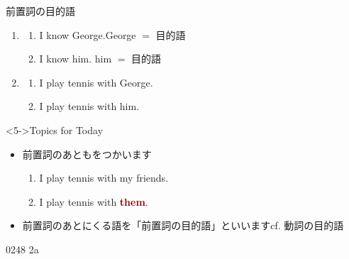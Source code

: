 \documentclass[aspectratio=169,xcolor={dvipsnames,table}]{beamer}
\begin{document}
\begin{frame}[plain]{前置詞の目的語}
 
\begin{enumerate}
 \item<1-> \begin{enumerate}
       \item<1-> I know George.\hfill{\scriptsize George $=$ 目的語}
       \item<2-> I know him. \hfill{\scriptsize him $=$ 目的語}
       \end{enumerate}
 \item<3-> \begin{enumerate}
       \item<3-> I play tennis with George.
	\item<4-> I play tennis with him.\hspace{20pt}
      \end{enumerate}
\end{enumerate}


\begin{block}<5->{Topics for Today}\small
\begin{itemize}[circle]
 \item<5-> 前置詞のあともをつかいます
       \begin{enumerate}
	\item<6-> I play tennis with my friends.
	\item<7-> I play tennis with \textcolor{Maroon}{\textbf{them}}.\hspace{30pt}
       \end{enumerate}
 \item<8-> 前置詞のあとにくる語を「前置詞の目的語」といいます\hfill{}cf. 動詞の目的語
\end{itemize}
     \end{block}

\hfill{\tiny 0248}\,{\scriptsize {}\,2a}
\end{frame}
\end{document}
